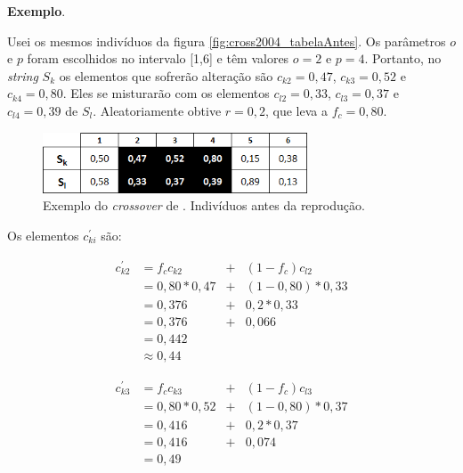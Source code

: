 	\textbf{Exemplo}.
	
	
	Usei os mesmos indivíduos da figura \ref{fig:cross2004_tabelaAntes}. Os parâmetros $o$ e $p$ foram escolhidos no intervalo [1,6] e têm valores $o = 2$ e $p = 4$. Portanto, no \emph{string} $S_k$ os elementos que sofrerão alteração são $c_{k2} = 0,47$, $c_{k3} = 0,52$ e $c_{k4} = 0,80$. Eles se misturarão com os elementos $c_{l2} = 0,33$, $c_{l3} = 0,37$ e $c_{l4} = 0,39$ de $S_l$. Aleatoriamente obtive $r = 0,2$, que leva a $f_c = 0,80$.
	
	\begin{figure}[htbp]
	\centering
		\includegraphics[width=0.70\textwidth]{figs/materiais_metodo/autovalores_com_ga/cross2011_tabelaAntes.png}
	\caption{Exemplo do \emph{crossover} de \cite{metodo2011}. Indivíduos antes da reprodução.}
	\label{fig:cross2011_tabelaAntes}
\end{figure}
	
	Os elementos $c^{'}_{ki}$ são:
	
	\begin{equation}
		\begin{array}{llcl}
			c^{'}_{k2}	& = f_c c_{k2} 		& + & (1- f_c) c_{l2} \\
									& = 0,80 * 0,47		& + &	(1 - 0,80) * 0,33 \\
									& = 0,376					& + & 0,2 * 0,33	\\
									& = 0,376					& + & 0,066	\\
									& = 0,442 \\
									& \approx 0,44
		\end{array}
	\end{equation}
	
	
	\begin{equation}
		\begin{array}{llcl}
			c^{'}_{k3}	& = f_c c_{k3} 		& + & (1- f_c) c_{l3} \\
									& = 0,80 * 0,52		& + &	(1 - 0,80) * 0,37 \\
									& = 0,416					& + & 0,2 * 0,37	\\
									& = 0,416					& + & 0,074	\\
									& = 0,49
		\end{array}
	\end{equation}
	
